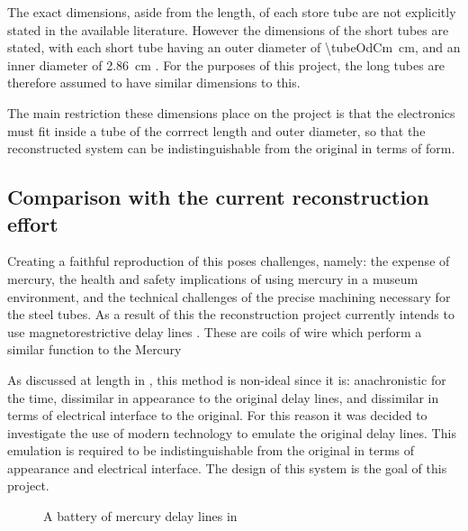 The exact dimensions, aside from the length, of each store tube are not explicitly stated in the available literature. However the dimensions of the short tubes are stated, with each short tube having an outer diameter of \SI{\tubeOdCm}{\centi\metre}, and an inner diameter of \SI{2.86}{\centi\metre} \cite[p. 213]{wilkes1948}. For the purposes of this project, the long tubes are therefore assumed to have similar dimensions to this.

The main restriction these dimensions place on the project is that the electronics must fit inside a tube of the corrrect length and outer diameter, so that the reconstructed system can be indistinguishable from the original in terms of form.

\section{Comparison with the current reconstruction effort} \label{sec:review-comparison}

Creating a faithful reproduction of this poses challenges, namely: the expense of mercury, the health and safety implications of using mercury in a museum environment, and the technical challenges of the precise machining necessary for the steel tubes. As a result of this the reconstruction project currently intends to use magnetorestrictive delay lines \cite{ward2011}. These are coils of wire which perform a similar function to the Mercury 

As discussed at length in \cite{tyler2017}, this method is non-ideal since it is: anachronistic for the time, dissimilar in appearance to the original delay lines, and dissimilar in terms of electrical interface to the original. For this reason it was decided to investigate the use of modern technology to emulate the original delay lines. This emulation is required to be indistinguishable from the original in terms of appearance and electrical interface. The design of this system is the goal of this project.


\begin{figure}[ht]
	\centering
	\caption{A battery of mercury delay lines in  \cite{cam2011c}}
	\label{fig:coffins}
\end{figure}

\chapter{} \label{sec:spec}

